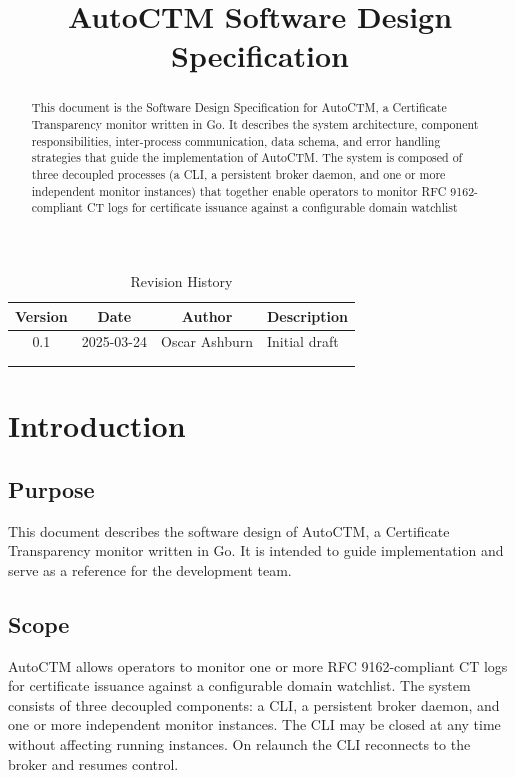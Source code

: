 \documentclass{article}
\title{AutoCTM Software Design Specification}
\author{}
\date{}
\begin{document}
\maketitle

\begin{abstract}
This document is the Software Design Specification for AutoCTM, a Certificate Transparency monitor written in Go. It describes the system architecture, component responsibilities, inter-process communication, data schema, and error handling strategies that guide the implementation of AutoCTM. The system is composed of three decoupled processes (a CLI, a persistent broker daemon, and one or more independent monitor instances) that together enable operators to monitor RFC 9162-compliant CT logs for certificate issuance against a configurable domain watchlist
\end{abstract}
\newpage
\tableofcontents
\newpage
\begin{table}[h]
\centering
\begin{tabular}{|c|c|c|p{7cm}|}
\hline
\textbf{Version} & \textbf{Date} & \textbf{Author} & \textbf{Description} \\
\hline
0.1 & 2025-03-24 & Oscar Ashburn& Initial draft \\
\hline
& & & \\
\hline
& & & \\
\hline
\end{tabular}
\caption{Revision History}
\end{table}
\section{Introduction}

\subsection{Purpose}
This document describes the software design of AutoCTM, a Certificate
Transparency monitor written in Go. It is intended to guide implementation
and serve as a reference for the development team.

\subsection{Scope}
AutoCTM allows operators to monitor one or more RFC 9162-compliant CT logs
for certificate issuance against a configurable domain watchlist. The system
consists of three decoupled components: a CLI, a persistent broker daemon,
and one or more independent monitor instances. The CLI may be closed at any
time without affecting running instances. On relaunch the CLI reconnects to
the broker and resumes control.
\end{document}
